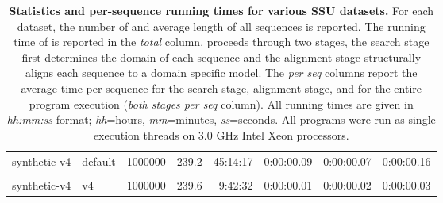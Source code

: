 \begin{table}[hb]
\begin{center}
\begin{tabular}{llrr|rrrr}
synthetic-v4    & default  & 1000000 &  239.2 &  45:14:17 &   0:00:00.09 &   0:00:00.07 &   0:00:00.16 \\
& & & & & & & \\
synthetic-v4    & v4       & 1000000 &  239.6 &   9:42:32 &   0:00:00.01 &   0:00:00.02 &   0:00:00.03 \\ 
\end{tabular}
\end{center}
\caption{\textbf{Statistics and  per-sequence running
    times for various SSU datasets.} For each dataset, the number of and average length of all
  sequences is reported. The running time of 
  is reported in the \emph{total} column.  proceeds
  through two stages, the search stage first determines the domain of
  each sequence and the alignment stage structurally aligns each
  sequence to a domain specific model. The \emph{per seq} columns report
  the average time per sequence for the search stage, alignment stage,
  and for the entire program execution (\emph{both stages per seq}
  column). All running times are given in \emph{hh:mm:ss} format;
  \emph{hh}=hours, \emph{mm}=minutes, \emph{ss}=seconds. All
  programs were run as single execution threads on 3.0 GHz Intel Xeon
  processors.}
\label{tbl:ptimes}
\end{table}
